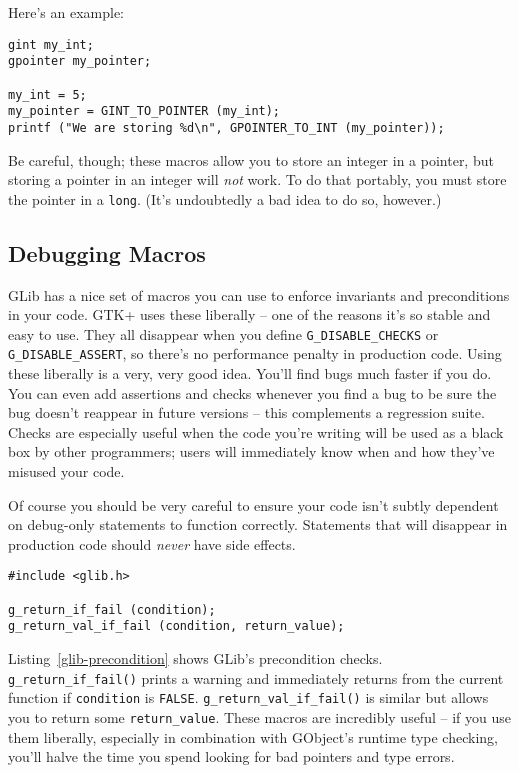 Here's an example:
\begin{lstlisting}
gint my_int;
gpointer my_pointer;

my_int = 5;
my_pointer = GINT_TO_POINTER (my_int);
printf ("We are storing %d\n", GPOINTER_TO_INT (my_pointer));
\end{lstlisting}

Be careful, though; these macros allow you to store an integer in a pointer, but storing a pointer in an integer will \emph{not} work. To do that portably, you must store the pointer in a \lstinline{long}. (It's undoubtedly a bad idea to do so, however.)

\subsection{Debugging Macros}
\label{glib-debugging-macros}

GLib has a nice set of macros you can use to enforce invariants and preconditions in your code. GTK+ uses these liberally -- one of the reasons it's so stable and easy to use. They all disappear when you define \lstinline{G_DISABLE_CHECKS} or \lstinline{G_DISABLE_ASSERT}, so there's no performance penalty in production code. Using these liberally is a very, very good idea. You'll find bugs much faster if you do. You can even add assertions and checks whenever you find a bug to be sure the bug doesn't reappear in future versions -- this complements a regression suite. Checks are especially useful when the code you're writing will be used as a black box by other programmers; users will immediately know when and how they've misused your code.

Of course you should be very careful to ensure your code isn't subtly dependent on debug-only statements to function correctly. Statements that will disappear in production code should \emph{never} have side effects.

\begin{lstlisting}[float, caption={Precondition Checks}, label=glib-precondition]
#include <glib.h>

g_return_if_fail (condition);
g_return_val_if_fail (condition, return_value);
\end{lstlisting}

Listing~\ref{glib-precondition} shows GLib's precondition checks. \lstinline{g_return_if_fail()} prints a warning and immediately returns from the current function if \lstinline{condition} is \lstinline{FALSE}. \lstinline{g_return_val_if_fail()} is similar but allows you to return some \lstinline{return_value}. These macros are incredibly useful -- if you use them liberally, especially in combination with GObject's runtime type checking, %
you'll halve the time you spend looking for bad pointers and type errors.

